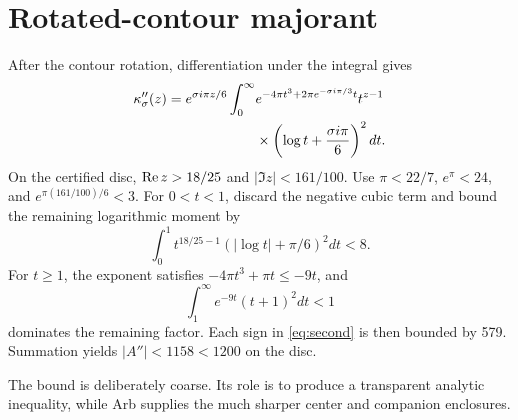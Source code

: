 \section{Rotated-contour majorant}\label{app:majorant}

After the contour rotation, differentiation under the integral gives
\begin{align}
\kappa_\sigma''(z)
=e^{\sigma i\pi z/6}\int_0^\infty
&e^{-4\pi t^3+2\pi e^{-\sigma i\pi/3}t}t^{z-1}\notag\\
&\times\left(\log t+\frac{\sigma i\pi}{6}\right)^2dt.
\label{eq:second}
\end{align}
On the certified disc,
$\operatorname{Re} z>18/25$ and $|\Im z|<161/100$. Use
$\pi<22/7$, $e^\pi<24$, and
$e^{\pi(161/100)/6}<3$. For $0<t<1$, discard the negative cubic term and
bound the remaining logarithmic moment by
\begin{equation}
\int_0^1 t^{18/25-1}\left(|\log t|+\pi/6\right)^2dt<8.
\end{equation}
For $t\ge1$, the exponent satisfies
$-4\pi t^3+\pi t\le-9t$, and
\begin{equation}
\int_1^\infty e^{-9t}(t+1)^2dt<1
\end{equation}
dominates the remaining factor. Each sign in \eqref{eq:second} is then
bounded by 579. Summation yields $|A''|<1158<1200$ on the disc.

The bound is deliberately coarse. Its role is to produce a transparent
analytic inequality, while Arb supplies the much sharper center and
companion enclosures.
